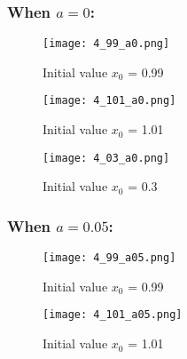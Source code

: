 \documentclass[a4paper]{article}
\begin{document}
        
        
    \newpage    
        \subsubsection{When $a=0$:}
        \begin{figure}[!htbp]
          \centering
          \begin{minipage}[b]{0.45\textwidth}
\texttt{[image: 4\_99\_a0.png]}
            \caption{Initial value $x_{0}$ = 0.99 }
          \end{minipage}
          \hfill
          \begin{minipage}[b]{0.45\textwidth}
            \texttt{[image: 4\_101\_a0.png]}
            \caption{Initial value $x_{0}$ = 1.01}
          \end{minipage}
        \end{figure}
         \begin{figure}[!htbp]
          \centering
          \begin{minipage}[b]{0.45\textwidth}
\texttt{[image: 4\_03\_a0.png]}
            \caption{Initial value $x_{0}$ = 0.3}
          \end{minipage}
          \hfill
        \end{figure}
 
\newpage 
 \subsubsection{When $a=0.05$:}
        \begin{figure}[!htbp]
          \centering
          \begin{minipage}[b]{0.45\textwidth}
\texttt{[image: 4\_99\_a05.png]}
            \caption{Initial value $x_{0}$ = 0.99 }
          \end{minipage}
          \hfill
          \begin{minipage}[b]{0.45\textwidth}
            \texttt{[image: 4\_101\_a05.png]}
            \caption{Initial value $x_{0}$ = 1.01}
          \end{minipage}
        \end{figure}
        
\newpage        
\end{document}
